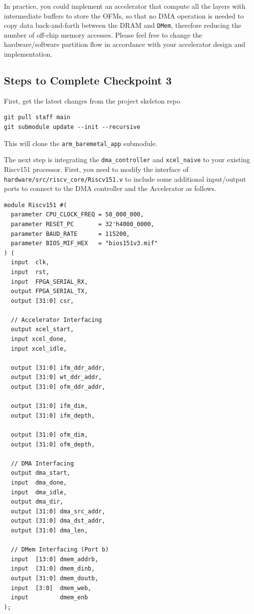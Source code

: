 \documentclass[11pt]{article}
\begin{document}
In practice, you could implement an accelerator that compute all the layers with intermediate buffers to store the OFMs, so that no DMA operation is needed to copy data back-and-forth between the DRAM and \texttt{DMem}, therefore reducing the number of off-chip memory accesses. Please feel free to change the hardware/software partition flow in accordance with your accelerator design and implementation.

\subsection{Steps to Complete Checkpoint 3}

First, get the latest changes from the project skeleton repo

\begin{verbatim}
git pull staff main
git submodule update --init --recursive
\end{verbatim}

This will clone the \verb|arm_baremetal_app| submodule.

The next step is integrating the \texttt{dma\_controller} and \texttt{xcel\_naive} to your existing Riscv151 processor.
First, you need to modify the interface of \verb|hardware/src/riscv_core/Riscv151.v| to include some additional input/output ports to connect to the DMA controller and the Accelerator as follows.

\newpage
\begin{verbatim}
module Riscv151 #(
  parameter CPU_CLOCK_FREQ = 50_000_000,
  parameter RESET_PC       = 32'h4000_0000,
  parameter BAUD_RATE      = 115200,
  parameter BIOS_MIF_HEX   = "bios151v3.mif"
) (
  input  clk,
  input  rst,
  input  FPGA_SERIAL_RX,
  output FPGA_SERIAL_TX,
  output [31:0] csr,

  // Accelerator Interfacing
  output xcel_start,
  input xcel_done,
  input xcel_idle,

  output [31:0] ifm_ddr_addr,
  output [31:0] wt_ddr_addr,
  output [31:0] ofm_ddr_addr,

  output [31:0] ifm_dim,
  output [31:0] ifm_depth,

  output [31:0] ofm_dim,
  output [31:0] ofm_depth,

  // DMA Interfacing
  output dma_start,
  input  dma_done,
  input  dma_idle,
  output dma_dir,
  output [31:0] dma_src_addr,
  output [31:0] dma_dst_addr,
  output [31:0] dma_len,

  // DMem Interfacing (Port b)
  input  [13:0] dmem_addrb,
  input  [31:0] dmem_dinb,
  output [31:0] dmem_doutb,
  input  [3:0]  dmem_web,
  input         dmem_enb
);
\end{verbatim}
\end{document}
